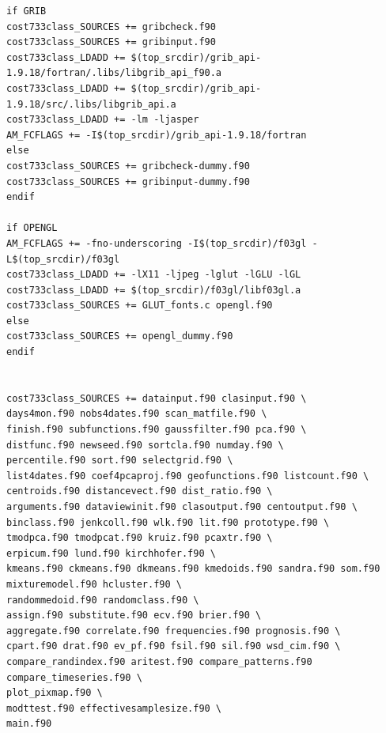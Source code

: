 \documentclass[12pt, oneside, a4paper, headsepline, plainheadsepline]{scrbook}
\begin{document}
\begin{itemize}
\begin{lstlisting}
if GRIB
cost733class_SOURCES += gribcheck.f90 
cost733class_SOURCES += gribinput.f90 
cost733class_LDADD += $(top_srcdir)/grib_api-1.9.18/fortran/.libs/libgrib_api_f90.a
cost733class_LDADD += $(top_srcdir)/grib_api-1.9.18/src/.libs/libgrib_api.a
cost733class_LDADD += -lm -ljasper
AM_FCFLAGS += -I$(top_srcdir)/grib_api-1.9.18/fortran
else
cost733class_SOURCES += gribcheck-dummy.f90 
cost733class_SOURCES += gribinput-dummy.f90 
endif

if OPENGL
AM_FCFLAGS += -fno-underscoring -I$(top_srcdir)/f03gl -L$(top_srcdir)/f03gl
cost733class_LDADD += -lX11 -ljpeg -lglut -lGLU -lGL
cost733class_LDADD += $(top_srcdir)/f03gl/libf03gl.a 
cost733class_SOURCES += GLUT_fonts.c opengl.f90
else
cost733class_SOURCES += opengl_dummy.f90
endif


cost733class_SOURCES += datainput.f90 clasinput.f90 \
days4mon.f90 nobs4dates.f90 scan_matfile.f90 \
finish.f90 subfunctions.f90 gaussfilter.f90 pca.f90 \
distfunc.f90 newseed.f90 sortcla.f90 numday.f90 \
percentile.f90 sort.f90 selectgrid.f90 \
list4dates.f90 coef4pcaproj.f90 geofunctions.f90 listcount.f90 \
centroids.f90 distancevect.f90 dist_ratio.f90 \
arguments.f90 dataviewinit.f90 clasoutput.f90 centoutput.f90 \
binclass.f90 jenkcoll.f90 wlk.f90 lit.f90 prototype.f90 \
tmodpca.f90 tmodpcat.f90 kruiz.f90 pcaxtr.f90 \
erpicum.f90 lund.f90 kirchhofer.f90 \
kmeans.f90 ckmeans.f90 dkmeans.f90 kmedoids.f90 sandra.f90 som.f90 mixturemodel.f90 hcluster.f90 \
randommedoid.f90 randomclass.f90 \
assign.f90 substitute.f90 ecv.f90 brier.f90 \
aggregate.f90 correlate.f90 frequencies.f90 prognosis.f90 \
cpart.f90 drat.f90 ev_pf.f90 fsil.f90 sil.f90 wsd_cim.f90 \
compare_randindex.f90 aritest.f90 compare_patterns.f90 compare_timeseries.f90 \
plot_pixmap.f90 \
modttest.f90 effectivesamplesize.f90 \
main.f90
\end{lstlisting}
\end{itemize}

\newpage
\cleardoublepage
\addcontentsline{toc}{chapter}{References}

{}
\end{document}
